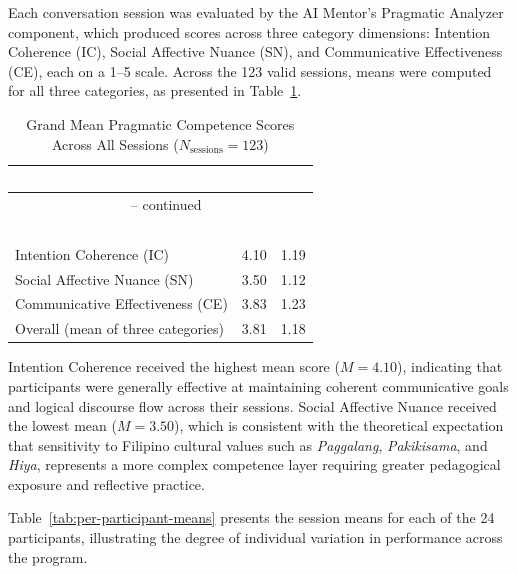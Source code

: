 Each conversation session was evaluated by the AI Mentor's Pragmatic Analyzer component, which produced scores across three category dimensions: Intention Coherence (IC), Social Affective Nuance (SN), and Communicative Effectiveness (CE), each on a 1--5 scale. Across the 123 valid sessions, means were computed for all three categories, as presented in Table~\ref{tab:grand-means}.

\begin{longtable}{p{6cm} p{2cm} p{2cm}}
\caption{Grand Mean Pragmatic Competence Scores Across All Sessions ($N_{\text{sessions}} = 123$)}
\label{tab:grand-means} \\

\rowcolor{headerblue}
\textcolor{white}{\textbf{Category}} &
\textcolor{white}{\textbf{$M$}} &
\textcolor{white}{\textbf{$SD$}} \\
\endfirsthead
\multicolumn{3}{c}{\tablename\ \thetable{} -- continued} \\
\rowcolor{headerblue}
\textcolor{white}{\textbf{Category}} &
\textcolor{white}{\textbf{$M$}} &
\textcolor{white}{\textbf{$SD$}} \\
\endhead

\midrule
Intention Coherence (IC) & 4.10 & 1.19 \\
\midrule
Social Affective Nuance (SN) & 3.50 & 1.12 \\
\midrule
Communicative Effectiveness (CE) & 3.83 & 1.23 \\
\midrule
Overall (mean of three categories) & 3.81 & 1.18 \\
\bottomrule
\end{longtable}

\noindent Intention Coherence received the highest mean score ($M = 4.10$), indicating that participants were generally effective at maintaining coherent communicative goals and logical discourse flow across their sessions. Social Affective Nuance received the lowest mean ($M = 3.50$), which is consistent with the theoretical expectation that sensitivity to Filipino cultural values such as \textit{Paggalang}, \textit{Pakikisama}, and \textit{Hiya}, represents a more complex competence layer requiring greater pedagogical exposure and reflective practice.

Table~\ref{tab:per-participant-means} presents the session means for each of the 24 participants, illustrating the degree of individual variation in performance across the program.

